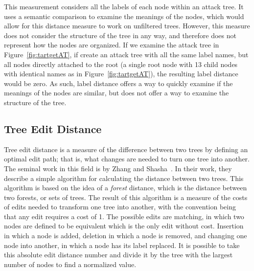This measurement considers all the labels of each node within an attack tree. It uses a semantic comparison to examine the meanings of the nodes, which would allow for this distance measure to work on unfiltered trees. However, this measure does not consider the structure of the tree in any way, and therefore does not represent how the nodes are organized. If we examine the attack tree in Figure~\ref{fig:tartgetAT}, if create an attack tree with all the same label names, but all nodes directly attached to the root (a single root node with 13 child nodes with identical names as in Figure~\ref{fig:tartgetAT}), the resulting label distance would be zero. As such, label distance offers a way to quickly examine if the meanings of the nodes are similar, but does not offer a way to examine the structure of the tree. 






\subsection{Tree Edit Distance}
\label{ssec:ted}

Tree edit distance is a measure of the difference between two trees by defining an optimal edit path; that is, what changes are needed to turn one tree into another. The seminal work in this field is by Zhang and Shasha~\cite{Zhang_Shasha_1989}. In their work, they describe a simple algorithm for calculating the distance between two trees. This algorithm is based on the idea of a \textit{forest} distance, which is the distance between two forests, or sets of trees. The result of this algorithm is a measure of the costs of edits needed to transform one tree into another, with the convention being that any edit requires a cost of 1. The possible edits are matching, in which two nodes are defined to be equivalent which is the only edit without cost. Insertion in which a node is added, deletion in which a node is removed, and changing one node into another, in which a node has its label replaced. It is possible to take this absolute edit distance number and divide it by the tree with the largest number of nodes to find a normalized value.

